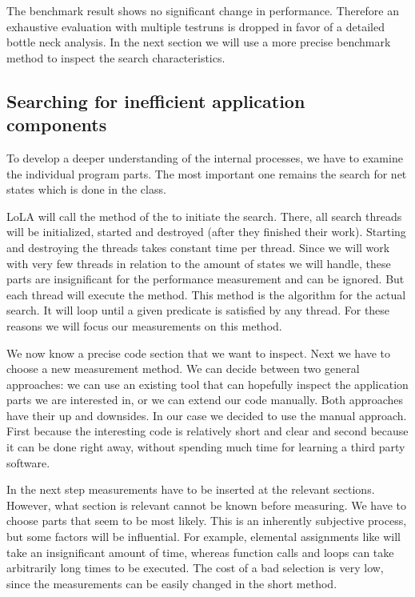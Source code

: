 The benchmark result shows no significant change in performance. Therefore an exhaustive evaluation with multiple testruns is dropped in favor of a detailed bottle neck analysis. In the next section we will use a more precise benchmark method to inspect the search characteristics.

\subsection{Searching for inefficient application components}
To develop a deeper understanding of the internal processes, we have to examine the individual program parts. The most important one remains the search for net states which is done in the  class.

LoLA will call the  method of the  to initiate the search. There, all search threads will be initialized, started and destroyed (after they finished their work). Starting and destroying the threads takes constant time per thread. Since we will work with very few threads in relation to the amount of states we will handle, these parts are insignificant for the performance measurement and can be ignored. But each thread will execute the  method. This method is the algorithm for the actual search. It will loop until a given predicate is satisfied by any thread. For these reasons we will focus our measurements on this method.

We now know a precise code section that we want to inspect. Next we have to choose a new measurement method. We can decide between two general approaches: we can use an existing tool that can hopefully inspect the application parts we are interested in, or we can extend our code manually. Both approaches have their up and downsides. In our case we decided to use the manual approach. First because the interesting code is relatively short and clear and second because it can be done right away, without spending much time for learning a third party software.

In the next step measurements have to be inserted at the relevant sections. However, what section is relevant cannot be known before measuring. We have to choose parts that seem to be most likely. This is an inherently subjective process, but some factors will be influential. For example, elemental assignments like  will take an insignificant amount of time, whereas function calls and loops can take arbitrarily long times to be executed. The cost of a bad selection is very low, since the measurements can be easily changed in the short method.

